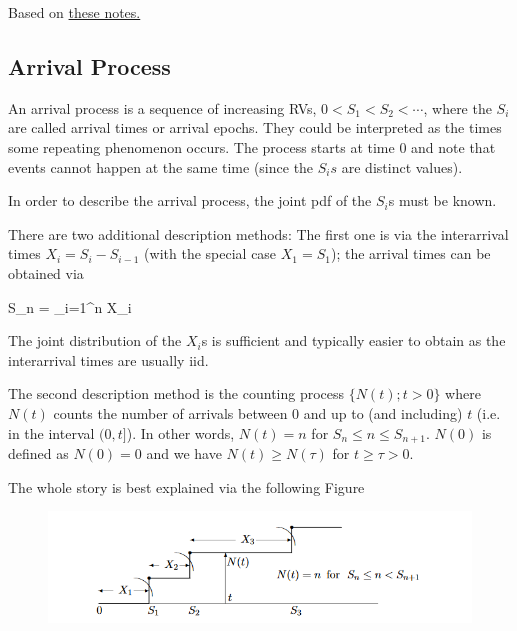 
Based on \href{https://ocw.mit.edu/courses/electrical-engineering-and-computer-science/6-262-discrete-stochastic-processes-spring-2011/course-notes/MIT6_262S11_chap02.pdf}{these notes.}

\subsection{Arrival Process}

An arrival process is a sequence of increasing RVs, $0 < S_1 < S_2 < \cdots$, where the $S_i$ are called arrival times or arrival epochs. They could be interpreted as the times some repeating phenomenon occurs. The process starts at time $0$ and note that events cannot happen at the same time (since the $S_is$ are distinct values).

In order to describe the arrival process, the joint pdf of the $S_i$s must be known.

There are two additional description methods: The first one is via the interarrival times $X_i = S_i - S_{i-1}$ (with the special case $X_1 = S_1$); the arrival times can be obtained via

\be\label{2019-01-07_eq0}
S_n = \sum_{i=1}^n X_i
\ee

The joint distribution of the $X_i$s is sufficient and typically easier to obtain as the interarrival times are usually iid.

The second description method is the counting process $\{N(t); t>0\}$ where $N(t)$ counts the number of arrivals between $0$ and up to (and including) $t$ (i.e. in the interval $(0,t]$). In other words, $N(t) = n$ for $S_n \leq n \leq S_{n+1}$. $N(0)$ is defined as $N(0) = 0$ and we have $N(t) \geq N(\tau)$ for $t \geq \tau > 0$.

The whole story is best explained via the following Figure

\begin{figure}[H]
  \includegraphics[scale=0.8]{images/poisson_process_1_1.png}
\end{figure}

